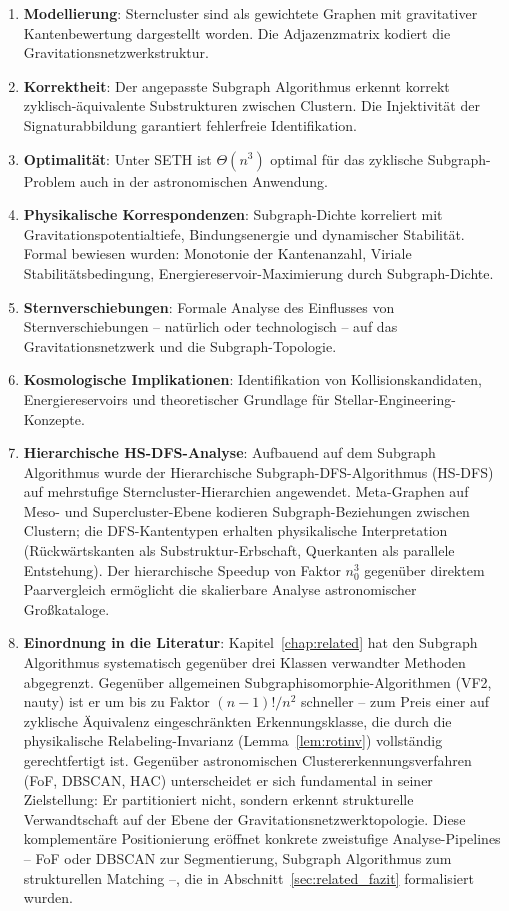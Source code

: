 ﻿\documentclass[a4paper,12pt]{report}
\theoremstyle{definition}
\begin{document}
\begin{enumerate}
    \item \textbf{Modellierung}: Sterncluster sind als gewichtete Graphen mit gravitativer Kantenbewertung dargestellt worden. Die Adjazenzmatrix kodiert die Gravitationsnetzwerkstruktur.
    \item \textbf{Korrektheit}: Der angepasste Subgraph Algorithmus erkennt korrekt zyklisch-äquivalente Substrukturen zwischen Clustern. Die Injektivität der Signaturabbildung garantiert fehlerfreie Identifikation.
    \item \textbf{Optimalität}: Unter SETH ist $\Theta(n^3)$ optimal für das zyklische Subgraph-Problem auch in der astronomischen Anwendung.
    \item \textbf{Physikalische Korrespondenzen}: Subgraph-Dichte korreliert mit Gravitationspotentialtiefe, Bindungsenergie und dynamischer Stabilität. Formal bewiesen wurden: Monotonie der Kantenanzahl, Viriale Stabilitätsbedingung, Energiereservoir-Maximierung durch Subgraph-Dichte.
    \item \textbf{Sternverschiebungen}: Formale Analyse des Einflusses von Sternverschiebungen -- natürlich oder technologisch -- auf das Gravitationsnetzwerk und die Subgraph-Topologie.
    \item \textbf{Kosmologische Implikationen}: Identifikation von Kollisionskandidaten, Energiereservoirs und theoretischer Grundlage für Stellar-Engineering-Konzepte.
    \item \textbf{Hierarchische HS-DFS-Analyse}: Aufbauend auf dem Subgraph Algorithmus wurde der Hierarchische Subgraph-DFS-Algorithmus (HS-DFS) auf mehrstufige Sterncluster-Hierarchien angewendet. Meta-Graphen auf Meso- und Supercluster-Ebene kodieren Subgraph-Beziehungen zwischen Clustern; die DFS-Kantentypen erhalten physikalische Interpretation (Rückwärtskanten als Substruktur-Erbschaft, Querkanten als parallele Entstehung). Der hierarchische Speedup von Faktor $n_0^3$ gegenüber direktem Paarvergleich ermöglicht die skalierbare Analyse astronomischer Großkataloge.
    \item \textbf{Einordnung in die Literatur}: Kapitel~\ref{chap:related} hat den Subgraph Algorithmus systematisch gegenüber drei Klassen verwandter Methoden abgegrenzt. Gegenüber allgemeinen Subgraphisomorphie-Algorithmen (VF2, nauty) ist er um bis zu Faktor $(n-1)!/n^2$ schneller -- zum Preis einer auf zyklische Äquivalenz eingeschränkten Erkennungsklasse, die durch die physikalische Relabeling-Invarianz (Lemma~\ref{lem:rotinv}) vollständig gerechtfertigt ist. Gegenüber astronomischen Clustererkennungsverfahren (FoF, DBSCAN, HAC) unterscheidet er sich fundamental in seiner Zielstellung: Er partitioniert nicht, sondern erkennt strukturelle Verwandtschaft auf der Ebene der Gravitationsnetzwerktopologie. Diese komplementäre Positionierung eröffnet konkrete zweistu\-fige Analyse-Pipelines -- FoF oder DBSCAN zur Segmentierung, Subgraph Algorithmus zum strukturellen Matching --, die in Abschnitt~\ref{sec:related_fazit} formalisiert wurden.
\end{enumerate}
\end{document}
